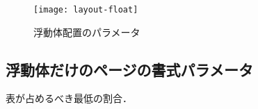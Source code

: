 \begin{figure}[htbp]
 \begin{center}
  \texttt{[image: layout-float]}
  \caption{浮動体配置のパラメータ}
 \end{center}
\end{figure}




\subsection{浮動体だけのページの書式パラメータ}

表が占めるべき最低の割合．